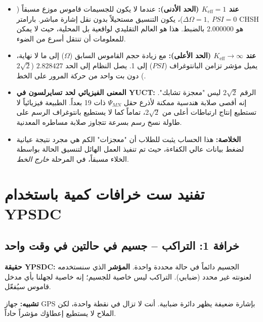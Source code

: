 \documentclass[11pt,a4paper]{article}
\begin{document}
	\begin{itemize}
		\item \textbf{عند \(K_{\mathrm{eff}} = 1\) (الحد الأدنى):}  
		عندما لا يكون للجسيمات قاموس موزع مسبقاً (\(\Delta\Omega = 1,\ PSI = 0\))، يكون التنسيق مستحيلاً بدون نقل إشارة مباشر. بارامتر CHSH هو \(2.000000\) بالضبط. هذا هو العالم التقليدي لواقعية بل المحلية، حيث لا يمكن للمعلومات أن تنتقل أسرع من الضوء.
		
		\item \textbf{عند \(K_{\mathrm{eff}} \to \infty\) (الحد الأعلى):}  
		مع زيادة حجم القاموس السابق (\(\Omega\)) إلى ما لا نهاية، يميل مؤشر تزامن البانتوغراف (\(PSI\)) إلى 1. يصل النظام إلى الحد \(2.828427\) (\(2\sqrt{2}\)) دون بت واحد من حركة المرور على الخط.
		
		\item \textbf{المعنى الفيزيائي لحد تسايرلسون في YUCT:}  
		الرقم \(2\sqrt{2}\) ليس "معجزة تشابك". إنه أقصى صلابة هندسية ممكنة لأذرع حقل \(\Psi_{MN}\) ذات 19 بعداً. الطبيعة فيزيائياً لا تستطيع إنتاج ارتباطات أعلى من \(2\sqrt{2}\)، تماماً كما لا يستطيع بانتوغراف الرسم على طاولة نسخ رسم بسرعة تتجاوز صلابة مساطره المعدنية.
		
		\item \textbf{الخلاصة:}  
		هذا الحساب يثبت للطلاب أن "معجزات" الكم هي مجرد نتيجة عيانية لضغط بيانات عالي الكفاءة، حيث تم تنفيذ العمل الهائل لتنسيق الحالة بواسطة الخلاء مسبقاً، في المرحلة \textit{خارج الخط}.
	\end{itemize}
	
	
	\section{تفنيد ست خرافات كمية باستخدام YPSDC}
	
	\subsection{خرافة 1: التراكب -- جسيم في حالتين في وقت واحد}
	\textbf{حقيقة YPSDC:} الجسيم دائماً في حالة محددة واحدة. \textbf{المؤشر} الذي سنستخدمه لعنونته غير محدد (ضبابي). التراكب ليس خاصية للجسيم؛ إنه خاصية لجهلنا بأي مدخل قاموس سيُفعّل.
	\par
	\textbf{تشبيه:} جهاز GPS بإشارة ضعيفة يظهر دائرة ضبابية. أنت لا تزال في نقطة واحدة، لكن الملاح لا يستطيع إعطاؤك مؤشراً حاداً.
	
\end{document}

